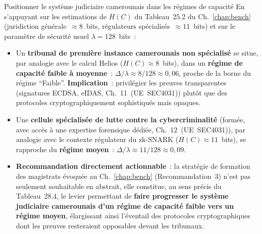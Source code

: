 \begin{boxscenario}{Positionner le système judiciaire camerounais dans
les régimes de capacité}
En s'appuyant sur les estimations de $H(C)$ du Tableau~25.2 du
Ch.~\ref{chap:bench} (juridiction générale~$\approx 8$~bits,
régulateurs spécialisés~$\approx 11$~bits) et sur le paramètre de
sécurité usuel $\lambda = 128$~bits~:

\begin{itemize}
    \item Un \textbf{tribunal de première instance camerounais
          non spécialisé} se situe, par analogie avec le calcul
          Helios ($H(C)\approx 8$~bits), dans un \textbf{régime
          de capacité faible à moyenne}~: $\Delta/\lambda \approx
          8/128 \approx 0{,}06$, proche de la borne du régime
          ``Faible''. \textbf{Implication}~: privilégier les
          preuves transparentes (signatures ECDSA, eIDAS,
          Ch.~11~(UE~SEC4031)) plutôt que des protocoles
          cryptographiquement sophistiqués mais opaques.
    \item Une \textbf{cellule spécialisée de lutte contre la
          cybercriminalité} (formée, avec accès à une expertise
          forensique dédiée, Ch.~12~(UE~SEC4031)), par analogie
          avec le contexte régulateur du zk-SNARK
          ($H(C)\approx 11$~bits), se rapproche du \textbf{régime
          moyen}~: $\Delta/\lambda \approx 11/128 \approx 0{,}09$.
    \item \textbf{Recommandation directement actionnable}~: la
          stratégie de formation des magistrats évoquée au
          Ch.~\ref{chap:bench} (Recommandation~3) n'est pas
          seulement souhaitable en abstrait, elle constitue,
          au sens précis du Tableau~28.4, le levier permettant de
          \textbf{faire progresser le système judiciaire camerounais
          d'un régime de capacité faible vers un régime moyen},
          élargissant ainsi l'éventail des protocoles cryptographiques
          dont les preuves resteraient opposables devant les
          tribunaux.
\end{itemize}
\end{boxscenario}

\separateur

